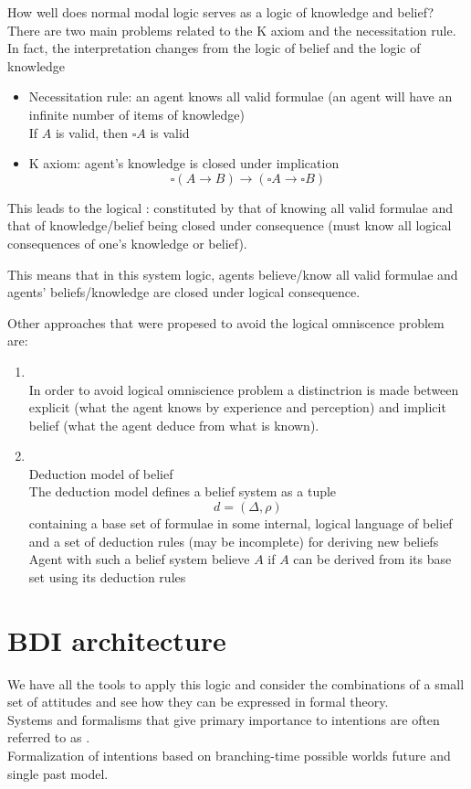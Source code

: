 How well does normal modal logic serves as a logic of knowledge and belief? There are two main problems related to the K axiom and the necessitation rule. In fact, the interpretation changes from the logic of belief and the logic of knowledge 
\begin{itemize}
\item Necessitation rule: an agent knows all valid formulae (an agent will have an infinite number of items of knowledge)\\
If $A$ is valid, then $\square A$ is valid
\item K axiom: agent's knowledge is closed under implication
\[\square(A\rightarrow B) \rightarrow (\square A \rightarrow \square B)\]
\end{itemize}
This leads to the logical : constituted by that of knowing all valid formulae and that of knowledge/belief being closed under consequence (must know all logical consequences of one's knowledge or belief).

This means that in this system logic, agents believe/know all valid formulae and agents' beliefs/knowledge are closed under logical consequence.

Other approaches that were propesed to avoid the logical omniscence problem are:
\begin{enumerate}
\item {}\\
In order to avoid logical omniscience problem a distinctrion is made between explicit (what the agent knows by experience and perception) and implicit belief (what the agent deduce from what is known).
\item {}\\
Deduction model of belief\\
The deduction model defines a belief system as a tuple
\[d=(\Delta, \rho)\]
containing a base set of formulae in some internal, logical language of belief and a set of deduction rules (may be incomplete) for deriving new beliefs\\
Agent with such a belief system believe $A$ if $A$ can be derived from its base set using its deduction rules
\end{enumerate}


\section{BDI architecture}
We have all the tools to apply this logic and consider the combinations of a small set of attitudes and see how they can be expressed in formal theory.\\
Systems and formalisms that give primary importance to intentions are often referred to as .\\
Formalization of intentions based on branching-time possible worlds future and single past model.\\

